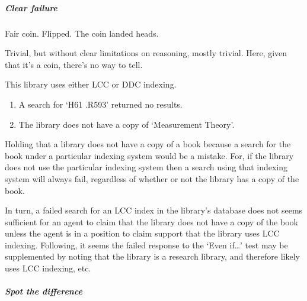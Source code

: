 \paragraph{}

\subparagraph{Clear failure}

\begin{note}
  Fair coin.
  Flipped.
  The coin landed heads.

  Trivial, but without clear limitations on reasoning, mostly trivial.
  Here, given that it's a coin, there's no way to tell.
\end{note}

\begin{note}
  This library uses either LCC or DDC indexing.
  \begin{enumerate}
  \item A search for `H61 .R593' returned no results.
  \item The library does not have a copy of `Measurement Theory'.
  \end{enumerate}

  Holding that a library does not have a copy of a book because a search for the book under a particular indexing system would be a mistake.
  For, if the library does not use the particular indexing system then a search using that indexing system will always fail, regardless of whether or not the library has a copy of the book.

  In turn, a failed search for an LCC index in the library's database does not seems sufficient for an agent to claim that the library does not have a copy of the book unless the agent is in a position to claim support that the library uses LCC indexing.
  Following, it seems the failed response to the `Even if\dots' test may be supplemented by noting that the library is a research library, and therefore likely uses LCC indexing, etc.\
\end{note}

\subparagraph{Spot the difference}


